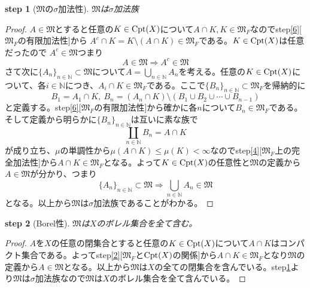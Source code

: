 \documentclass[leqno]{jsarticle}
\newtheorem{stp}{{\bf step}}
\newcommand{\To}{\Longrightarrow}
\newcommand{\nn}{\mathbb{N}}
\newcommand{\mgn}{\infty}
\newcommand{\dpst}{\displaystyle}
\newcommand{\mm}{\mathfrak{M}}
\newcommand{\mf}{\mathfrak{M}_F}
\newcommand{\cpt}{{\rm Cpt}(X)}
\newcommand{\s}{\sigma}
\begin{document}
\begin{stp}[$\mm$の$\s$加法性]\label{8}$\mm$は$\sigma$加法族
\end{stp}
\begin{proof}
$A\in \mm$とすると任意の$K\in \cpt$について$A\cap K,K\in \mf$なのでstep\ref{6}[$\mf$の有限加法性]から
$A^{c}\cap K=K\setminus (A\cap K)\in \mf$である。$K\in\cpt$は任意だったので
$A^{c}\in \mm$つまり
\[
A\in \mm\To A^{c}\in \mm
\]
さて次に$\{A_n\}_{n\in\nn}\subset \mm$について$\dpst A=\bigcup_{n\in \nn}A_n$を考える。任意の$K\in \cpt$について、各$i\in \nn$につき、$A_i \cap K\in \mf$である。ここで$\{B_n\}_{n\in\nn}\subset \mf$を帰納的に
\[
B_1=A_1 \cap K,\ B_n=(A_n\cap K)\setminus (B_1\cup B_2\cup\cdots \cup B_{n-1} )
\]
と定義する。step\ref{6}[$\mf$の有限加法性]から確かに各$n$について$B_n\in \mf$である。そして定義から明らかに$\{B_n\}_{n\in\nn}$は互いに素な族で
\[
\coprod_{n\in \nn}B_n=A\cap K
\]
が成り立ち、$\mu$の単調性から$\mu(A\cap K)\le \mu(K)<\mgn$なのでstep\ref{4}[$\mf$上の完全加法性]から$A\cap K\in \mf$となる。よって$K\in \cpt$の任意性と$\mm$の定義から$A\in \mm$が分かり、つまり
\[
\{A_n\}_{n\in\nn}\subset \mm\To \bigcup_{n\in \nn}A_n\in \mm
\]
となる。以上から$\mm$は$\s$加法族であることがわかる。
\end{proof}


\begin{stp}[Borel性]\label{9}
$\mm$は$X$のボレル集合を全て含む。
\end{stp}
\begin{proof}$A$を$X$の任意の閉集合とすると任意の$K\in \cpt$について$A\cap K$はコンパクト集合である。よってstep\ref{2}[$\mf$と$\cpt$の関係]から$A\cap K\in \mf$となり$\mm$の定義から$A\in \mm$となる。以上から$\mm$は$X$の全ての閉集合を含んでいる。step\ref{8}より$\mm$は$\s$加法族なので$\mm$は$X$のボレル集合を全て含んでいる。
\end{proof}
\end{document}
